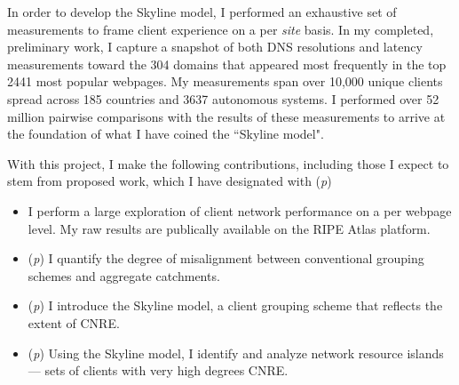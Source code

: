 
In order to develop the Skyline model, I performed an exhaustive set of measurements to frame
client experience on a per \emph{site} basis. In my completed, preliminary work, I capture a
snapshot of both DNS resolutions and latency measurements toward the 304 domains that appeared most
frequently in the top 2441 most popular webpages. My measurements span over 10,000 unique
clients spread across 185 countries and 3637 autonomous systems. I performed over 52 million pairwise
comparisons with the results of these measurements to arrive at the foundation of what I have
coined the ``Skyline model". 

With this project, I make the following contributions, including those I expect to stem from
proposed work, which I have designated with (\emph{p})

\begin{itemize}\parskip0pt 
    \item I perform a large exploration of client network performance on a per webpage level. My
        raw results are publically available on the RIPE Atlas platform.
    \item (\emph{p}) I quantify the degree of misalignment between conventional grouping schemes
        and aggregate catchments.
    \item (\emph{p}) I introduce the Skyline model, a client grouping scheme that reflects the
        extent of CNRE.
    \item (\emph{p}) Using the Skyline model, I identify and analyze network resource islands --- 
        sets of clients with very high degrees CNRE. 
\end{itemize}

